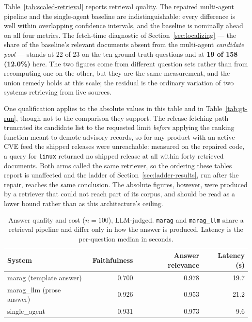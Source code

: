 \documentclass[acmsmall,review,anonymous,screen]{acmart}
\begin{document}
Table~\ref{tab:scaled-retrieval} reports retrieval quality. The repaired
multi-agent pipeline and the single-agent baseline are indistinguishable: every
difference is well within overlapping confidence intervals, and the baseline is
nominally ahead on all four metrics. The fetch-time diagnostic of Section~\ref{sec:localizing} --- the share of the
baseline's relevant documents absent from the multi-agent \emph{candidate pool}
--- stands at 22 of 23 on the ten ground-truth questions and at \textbf{19 of
158 (12.0\%)} here. The two figures come from different question sets rather
than from recomputing one on the other, but they are the same measurement, and
the union remedy holds at this scale; the residual is the ordinary variation of
two systems retrieving from live sources.

One qualification applies to the absolute values in this table and in
Table~\ref{tab:gt-run}, though not to the comparison they support. The
release-fetching path truncated its candidate list to the requested limit
\emph{before} applying the ranking function meant to demote advisory records,
so for any product with an active CVE feed the shipped releases were unreachable:
measured on the repaired code, a query for \texttt{linux} returned no shipped
release at all within forty retrieved documents. Both arms called the same
retriever, so the ordering these tables report is unaffected and the ladder of
Section~\ref{sec:ladder-results}, run after the repair, reaches the same
conclusion. The absolute figures, however, were produced by a retriever that
could not reach part of its corpus, and should be read as a lower bound rather
than as this architecture's ceiling.

\begin{table}[t]
\caption{Answer quality and cost ($n=100$), LLM-judged. \texttt{marag} and
\texttt{marag\_llm} share a retrieval pipeline and differ only in how the answer
is produced. Latency is the per-question median in seconds.}
\label{tab:scaled-answer}
\begin{tabular}{lrrr}
\toprule
System & Faithfulness & Answer relevance & Latency (s) \\
\midrule
marag (template answer) & 0.700 & 0.978 & 19.7 \\
marag\_llm (prose answer) & 0.926 & 0.953 & 21.2 \\
single\_agent & 0.931 & 0.973 & 9.6 \\
\bottomrule
\end{tabular}
\end{table}
\end{document}
